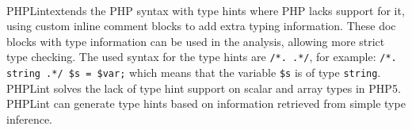 \documentclass[../main.tex]{subfiles}
\begin{document}
    \paragraph{}
    PHPLint\footnotemark extends the PHP syntax with type hints where PHP lacks support for it, using custom inline comment blocks to add extra typing information.
    These doc blocks with type information can be used in the analysis, allowing more strict type checking.
    The used syntax for the type hints are \texttt{/*. .*/}, for example: \texttt{/*. string .*/ \$s = \$var;} which means that the variable \texttt{\$s} is of type \texttt{string}.
    PHPLint solves the lack of type hint support on scalar and array types in PHP5.
    PHPLint can generate type hints based on information retrieved from simple type inference.
    
\end{document}
